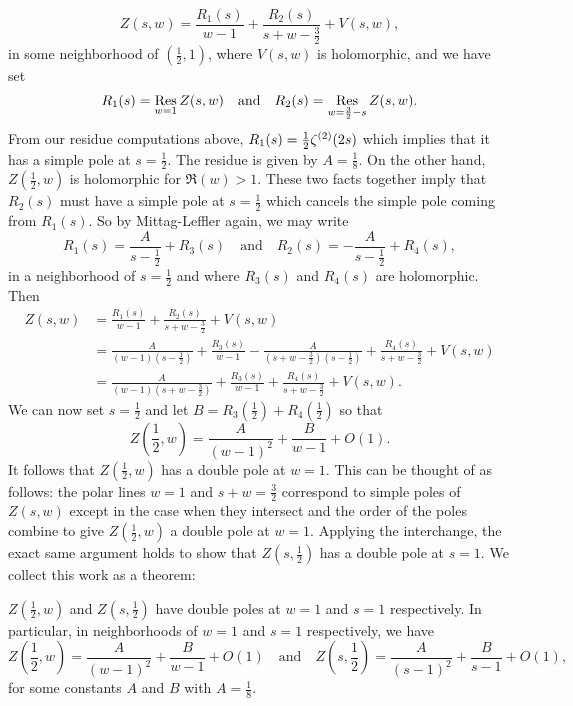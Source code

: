 \documentclass[12pt,reqno,oneside]{amsart}
\begin{document}
    \[
        Z(s,w) = \frac{R_{1}(s)}{w-1}+\frac{R_{2}(s)}{s+w-\frac{3}{2}}+V(s,w),
    \]
    in some neighborhood of $\left(\frac{1}{2},1\right)$, where $V(s,w)$ is holomorphic, and we have set
    \[
        R_{1}(s) = \operatorname*{\mathrm{Res}}_{w = 1}Z(s,w) \quad \text{and} \quad R_{2}(s) = \operatorname*{\mathrm{Res}}_{w = \frac{3}{2}-s}Z(s,w).
    \]
    From our residue computations above, $R_{1}(s) = \frac{1}{2}\zeta^{(2)}(2s)$ which implies that it has a simple pole at $s = \frac{1}{2}$. The residue is given by $A = \frac{1}{8}$. On the other hand, $Z\left(\frac{1}{2},w\right)$ is holomorphic for $\Re(w) > 1$. These two facts together imply that $R_{2}(s)$ must have a simple pole at $s = \frac{1}{2}$ which cancels the simple pole coming from $R_{1}(s)$. So by Mittag-Leffler again, we may write
    \[
        R_{1}(s) = \frac{A}{s-\frac{1}{2}}+R_{3}(s) \quad \text{and} \quad R_{2}(s) = -\frac{A}{s-\frac{1}{2}}+R_{4}(s),
    \]
    in a neighborhood of $s = \frac{1}{2}$ and where $R_{3}(s)$ and $R_{4}(s)$ are holomorphic. Then
    \begin{align*}
        Z(s,w) &= \frac{R_{1}(s)}{w-1}+\frac{R_{2}(s)}{s+w-\frac{3}{2}}+V(s,w) \\ 
        &= \frac{A}{(w-1)\left(s-\frac{1}{2}\right)}+\frac{R_{3}(s)}{w-1}-\frac{A}{\left(s+w-\frac{3}{2}\right)\left(s-\frac{1}{2}\right)}+\frac{R_{4}(s)}{s+w-\frac{3}{2}}+V(s,w) \\
        &= \frac{A}{(w-1)\left(s+w-\frac{3}{2}\right)}+\frac{R_{3}(s)}{w-1}+\frac{R_{4}(s)}{s+w-\frac{3}{2}}+V(s,w).
    \end{align*}
    We can now set $s = \frac{1}{2}$ and let $B = R_{3}\left(\frac{1}{2}\right)+R_{4}\left(\frac{1}{2}\right)$ so that
    \[
        Z\left(\frac{1}{2},w\right) = \frac{A}{(w-1)^{2}}+\frac{B}{w-1}+O(1).
    \]
    It follows that $Z\left(\frac{1}{2},w\right)$ has a double pole at $w = 1$. This can be thought of as follows: the polar lines $w = 1$ and $s+w = \frac{3}{2}$ correspond to simple poles of $Z(s,w)$ except in the case when they intersect and the order of the poles combine to give $Z\left(\frac{1}{2},w\right)$ a double pole at $w = 1$. Applying the interchange, the exact same argument holds to show that $Z\left(s,\frac{1}{2}\right)$ has a double pole at $s = 1$. We collect this work as a theorem:

    \begin{theorem}\label{thm:double_poles_at_1/2}
        $Z\left(\frac{1}{2},w\right)$ and $Z\left(s,\frac{1}{2}\right)$ have double poles at $w = 1$ and $s = 1$ respectively. In particular, in neighborhoods of $w = 1$ and $s = 1$ respectively, we have
        \[
            Z\left(\frac{1}{2},w\right) = \frac{A}{(w-1)^{2}}+\frac{B}{w-1}+O(1) \quad \text{and} \quad Z\left(s,\frac{1}{2}\right) = \frac{A}{(s-1)^{2}}+\frac{B}{s-1}+O(1),
        \]
        for some constants $A$ and $B$ with $A = \frac{1}{8}$. 
    \end{theorem}

    
    
\end{document}
